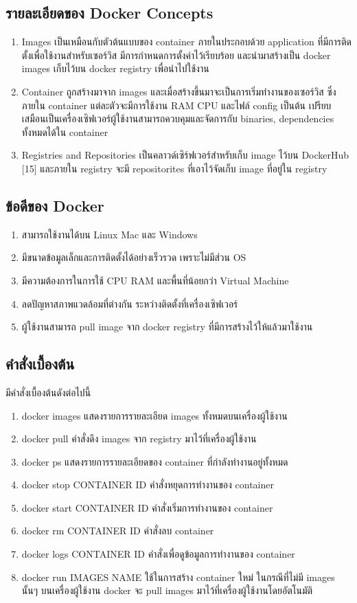 	\subsection{รายละเอียดของ Docker Concepts}
		\begin{enumerate}
			\item Images เป็นเหมือนกับตัวต้นแบบของ container ภายในประกอบด้วย application ที่มีการติดตั้งเพื่อใช้งานสำหรับเซอร์วิส มีการกำหนดการตั้งค่าไว้เรียบร้อย และนำมาสร้างเป็น docker images เก็บไว้บน docker registry เพื่อนำไปใช้งาน
			\item Container ถูกสร้างมาจาก images และเมื่อสร้างขึ้นมาจะเป็นการเริ่มทำงานของเซอร์วิส ซึ่งภายใน container แต่ละตัวจะมีการใช้งาน RAM CPU และไฟล์ config เป็นต้น เปรียบเสมือนเป็นเครื่องเซิฟเวอร์ผู้ใช้งานสามารถควบคุมและจัดการกับ binaries, dependencies ทั้งหมดได้ใน container
			\item Registries and Repositories เป็นคลาวด์เซิร์ฟเวอร์สำหรับเก็บ image ไว้บน DockerHub [15] และภายใน registry จะมี repositorites ที่เอาไว้จัดเก็บ image ที่อยู่ใน registry
		\end{enumerate}

	\subsection{ข้อดีของ Docker}
		\begin{enumerate}
			\item สามารถใช้งานได้บน Linux Mac และ Windows
			\item มีขนาดข้อมูลเล็กและการติดตั้งได้อย่างเร็วรวด เพราะไม่มีส่วน OS
			\item มีความต้องการในการใช้ CPU RAM และพื้นที่น้อยกว่า Virtual Machine
			\item ลดปัญหาสภาพแวดล้อมที่ต่างกัน ระหว่างติดตั้งที่เครื่องเซิฟเวอร์
			\item ผู้ใช้งานสามารถ pull image จาก docker registry ที่มีการสร้างไว้ให้แล้วมาใช้งาน 
		\end{enumerate}
	\subsection{คำสั่งเบื้องต้น}
		มีคำสั่งเบื้องต้นดังต่อไปนี้
		\begin{enumerate}
			\item docker images แสดงรายการรายละเอียด images ทั้งหมดบนเครื่องผู้ใช้งาน
			\item docker pull คำสั่งดึง images จาก registry มาไว้ที่เครื่องผู้ใช้งาน
			\item docker ps แสดงรายการรายละเอียดของ container ที่กำลังทำงานอยู่ทั้งหมด
			\item docker stop CONTAINER ID คำสั่งหยุดการทำงานของ container 
			\item docker start CONTAINER ID คำสั่งเริ่มการทำงานของ container 
			\item docker rm CONTAINER ID คำสั่งลบ container
			\item docker logs CONTAINER ID คำสั่งเพื่อดูข้อมูลการทำงานของ container
			\item docker run IMAGES NAME ใช้ในการสร้าง container ใหม่ ในกรณีที่ไม่มี images นั้นๆ บนเครื่องผู้ใช้งาน docker จะ pull images มาไว้ที่เครื่องผู้ใช้งานโดยอัตโนมัติ
		\end{enumerate}
	
